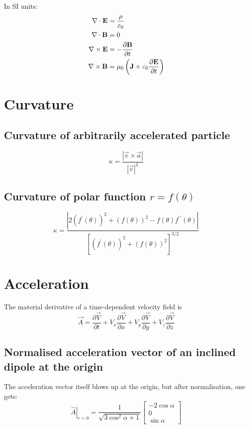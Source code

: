 \documentclass{book}
\newcommand{\pd}[2]{\frac{\partial {#1}}{\partial {#2}}}
\begin{document}
In SI units:
\begin{align}
    \nabla\cdot{\bf E} &= \frac{\rho}{\varepsilon_0} \\
    \nabla\cdot{\bf B} &= 0 \\
    \nabla\times{\bf E} &= -\pd{\bf B}{t} \\
    \nabla\times{\bf B} &= \mu_0\left({\bf J} + \varepsilon_0 \pd{\bf E}{t}\right)
\end{align}

\section{Curvature}

\subsection{Curvature of arbitrarily accelerated particle}

\begin{equation}
    \kappa = \frac{|\vec{v}\times\vec{a}|}{|\vec{v}|^3}
\end{equation}

\subsection{Curvature of polar function $r = f(\theta)$}

\begin{equation}
    \kappa = \frac{|2(f^\prime(\theta))^2 + (f(\theta))^2 - f(\theta)f^{\prime\prime}(\theta)|}{\left[(f^\prime(\theta))^2 + (f(\theta))^2\right]^{3/2}}
    \label{eqn:curvature_polar}
\end{equation}

\section{Acceleration}

The material derivative of a time-dependent velocity field is
\begin{equation}
    \vec{A} = \pd{\vec{V}}{t} + V_x\pd{\vec{V}}{x} + V_y\pd{\vec{V}}{y} + V_z\pd{\vec{V}}{z}
\end{equation}

\subsection{Normalised acceleration vector of an inclined dipole at the origin}

The acceleration vector itself blows up at the origin, but after normalisation, one gets:
\begin{equation}
    \left.\hat{A}\right|_{r=0} = \frac{1}{\sqrt{3\cos^2\alpha+1}}\begin{bmatrix} -2\cos\alpha \\ 0 \\ \sin\alpha \end{bmatrix}
\end{equation}
\end{document}
